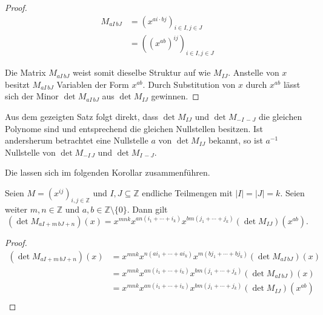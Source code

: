 \begin{proof}    
    \begin{align*}
        M_{aI\,bJ}   &= \left(x^{ai\cdot bj}\right)_{i\in I,j\in J} \\
                    &= \left((x^{ab})^{ij}\right)_{i\in I,j\in J}
    \end{align*}

    Die Matrix $M_{aI\,bJ}$ weist somit dieselbe Struktur auf wie $M_{IJ}$. Anstelle von $x$ besitzt $M_{aI\,bJ}$ Variablen der Form $x^{ab}$. Durch Substitution von $x$ durch $x^{ab}$ lässt sich der Minor $\det M_{aI\,bJ}$ aus $\det M_{IJ}$ gewinnen.
\end{proof}

Aus dem gezeigten Satz folgt direkt, dass $\det{} M_{IJ}$ und $\det{} M_{-I\,-J}$ die gleichen Polynome sind und entsprechend die gleichen Nullstellen besitzen. Ist andersherum betrachtet eine Nullstelle $a$ von $\det M_{IJ}$ bekannt, so ist $a^{-1}$ Nullstelle von $\det M_{-I\,J}$ und $\det M_{I\,-J}$.

Die  lassen sich im folgenden Korollar zusammenführen.

\begin{korollar}
    Seien $M = \left( x^{ij} \right)_{i,j \in \mathbb{Z}}$ und $I,J \subseteq \mathbb{Z}$ endliche Teilmengen mit ${|I|=|J|=k}$. Seien weiter $m,n \in \mathbb{Z}$ und $a,b \in \mathbb{Z}\setminus\{0\}$. Dann gilt
    \begin{equation*}
        \left( \det{} M_{aI+m\,bJ+n} \right) (x) = x^{mnk} x^{an(i_1+\cdots +i_k)} x^{bm(j_1 +\cdots + j_k)} \left( \det{} M_{IJ} \right) (x^{ab}).
    \end{equation*}
\end{korollar}

\begin{proof}
    \begin{align*}
        \left( \det{} M_{aI+m\,bJ+n} \right) (x)    &= x^{mnk} x^{n(ai_1+\cdots +ai_k)} x^{m(bj_1 +\cdots + bj_k)} \left( \det{} M_{aI\,bJ} \right) (x) \\
                                                    &= x^{mnk} x^{an(i_1+\cdots +i_k)} x^{bm(j_1 +\cdots + j_k)} \left( \det{} M_{aI\,bJ} \right) (x) \\
                                                    &= x^{mnk} x^{an(i_1+\cdots +i_k)} x^{bm(j_1 +\cdots + j_k)} \left( \det{} M_{IJ} \right) (x^{ab}) \\
    \end{align*}
\end{proof}

